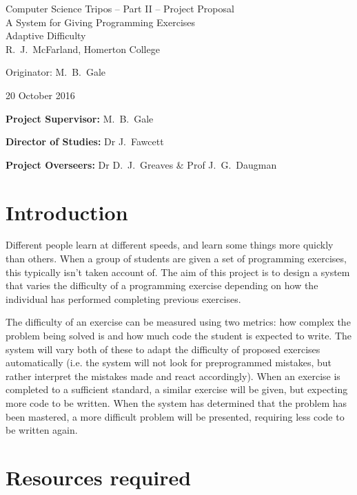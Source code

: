 \documentclass[12pt,a4paper,twoside]{article}
\begin{document}
\begin{center}
\Large
Computer Science Tripos -- Part II -- Project Proposal\\[4mm]
\LARGE
A System for Giving Programming Exercises \\Adaptive Difficulty\\[4mm]

\large
R.~J.~McFarland, Homerton College

Originator: M.~B.~Gale

20 October 2016
\end{center}

\vspace{5mm}

\textbf{Project Supervisor:} M.~B.~Gale

\textbf{Director of Studies:} Dr J.~Fawcett

\textbf{Project Overseers:} Dr D.~J.~Greaves  \& Prof J.~G.~Daugman


\section*{Introduction}

Different people learn at different speeds, and learn some things more quickly than others. When a group of students are given a set of programming exercises, this typically isn't taken account of. The aim of this project is to design a system that varies the difficulty of a programming exercise depending on how the individual has performed completing previous exercises. 

The difficulty of an exercise can be measured using two metrics: how complex the problem being solved is and how much code the student is expected to write. The system will vary both of these to adapt the difficulty of proposed exercises automatically (i.e. the system will not look for preprogrammed mistakes, but rather interpret the mistakes made and react accordingly). When an exercise is completed to a sufficient standard, a similar exercise will be given, but expecting more code to be written. When the system has determined that the problem has been mastered, a more difficult problem will be presented, requiring less code to be written again.

\section*{Resources required}
\end{document}

